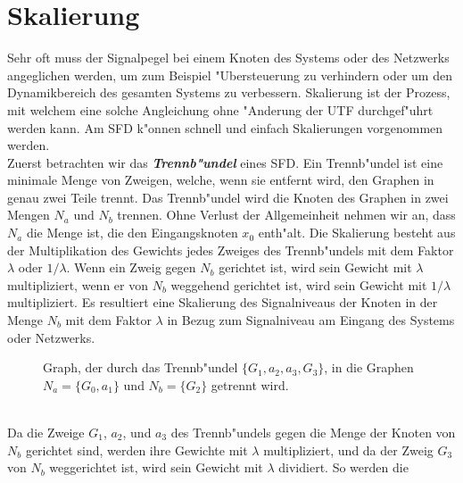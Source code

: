 \section{Skalierung } 
Sehr oft muss der Signalpegel bei einem Knoten des Systems oder des
Netzwerks angeglichen werden, um zum Beispiel "Ubersteuerung zu
verhindern oder um den Dynamikbereich des
gesamten Systems zu verbessern.  Skalierung ist der Prozess, mit
welchem eine solche Angleichung ohne "Anderung der UTF durchgef"uhrt
werden kann. Am SFD k"onnen
schnell und einfach Skalierungen vorgenommen werden.\\
\nit Zuerst betrachten wir das
\textbf{\emph{Trennb"undel}} eines SFD.  Ein
Trennb"undel ist eine minimale Menge von Zweigen, welche, wenn sie
entfernt wird, den Graphen in genau zwei Teile trennt. Das
Trennb"undel wird die Knoten des Graphen in zwei Mengen $N_a$ und
$N_b$ trennen. Ohne Verlust der Allgemeinheit nehmen wir an, dass
$N_a$ die Menge ist, die den Eingangsknoten $x_0$ enth"alt. Die
Skalierung besteht aus der Multiplikation des Gewichts jedes Zweiges
des Trennb"undels mit dem Faktor $\lambda$ oder $1/\lambda$. Wenn ein
Zweig gegen $N_b$ gerichtet ist, wird sein Gewicht mit $\lambda$
multipliziert, wenn er von $N_b$ weggehend gerichtet ist, wird sein
Gewicht mit $1/\lambda$ multipliziert.  Es resultiert eine Skalierung
des Signalniveaus der Knoten in der Menge $N_b$ mit dem Faktor
$\lambda$ in Bezug zum Signalniveau am Eingang des Systems oder
Netzwerks. \\
\begin{figure}[htb!]
\vspace*{-3mm}\begin{center}
  \caption{Graph,
    der durch das Trennb"undel $\{G_1,a_2,a_3,G_3\}$, in die Graphen
    $N_a=\{G_0,a_1\}$ und $N_b=\{G_2\}$ getrennt wird.}\label{SFD40}
\end{center}\vspace*{-7mm}
\end{figure}\\ 
\nit Da die Zweige $G_1$, $a_2$, und $a_3$ des Trennb"undels gegen die
Menge der Knoten von $N_b$ gerichtet sind, werden ihre Gewichte mit
$\lambda$ multipliziert, und da der Zweig $G_3$ von $N_b$ weggerichtet
ist, wird sein Gewicht mit $\lambda$ dividiert.  So werden die
